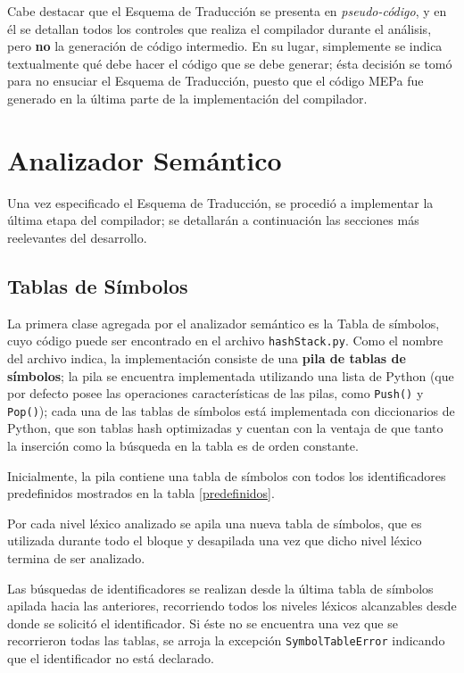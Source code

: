 \documentclass[a4paper,oneside]{report}
\begin{document}
Cabe destacar que el Esquema de Traducción se presenta en \emph{pseudo-código}, y en él se detallan todos los controles que realiza el compilador durante el análisis, pero {\bf no} la generación de código intermedio. En su lugar, simplemente se indica textualmente qué debe hacer el código que se debe generar; ésta decisión se tomó para no ensuciar el Esquema de Traducción, puesto que el código MEPa fue generado en la última parte de la implementación del compilador.

\chapter{Analizador Semántico}

Una vez especificado el Esquema de Traducción, se procedió a implementar la última etapa del compilador; se detallarán a continuación las secciones más reelevantes del desarrollo.

\section{Tablas de Símbolos}
La primera clase agregada por el analizador semántico es la Tabla de símbolos, cuyo código puede ser encontrado en el archivo \texttt{hashStack.py}. Como el nombre del archivo indica, la implementación consiste de una {\bf pila de tablas de símbolos}; la pila se encuentra implementada utilizando una lista de Python (que por defecto posee las operaciones características de las pilas, como \texttt{Push()} y \texttt{Pop()}); cada una de las tablas de símbolos está implementada con diccionarios de Python, que son tablas hash optimizadas y cuentan con la ventaja de que tanto la inserción como la búsqueda en la tabla es de orden constante.

Inicialmente, la pila contiene una tabla de símbolos con todos los identificadores predefinidos mostrados en la tabla \ref{predefinidos}.

Por cada nivel léxico analizado se apila una nueva tabla de símbolos, que es utilizada durante todo el bloque y desapilada una vez que dicho nivel léxico termina de ser analizado.

Las búsquedas de identificadores se realizan desde la última tabla de símbolos apilada hacia las anteriores, recorriendo todos los niveles léxicos alcanzables desde donde se solicitó el identificador. Si éste no se encuentra una vez que se recorrieron todas las tablas, se arroja la excepción \texttt{SymbolTableError} indicando que el identificador no está declarado.
\end{document}
